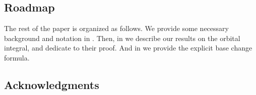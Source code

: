 \begin{theorem}
\end{theorem}

\subsection{Roadmap}
The rest of the paper is organized as follows.
We provide some necessary background and notation in .
Then, in  we describe our results on the orbital integral,
and dedicate  to their proof.
And in  we provide the explicit base change formula.

\subsection{Acknowledgments}
